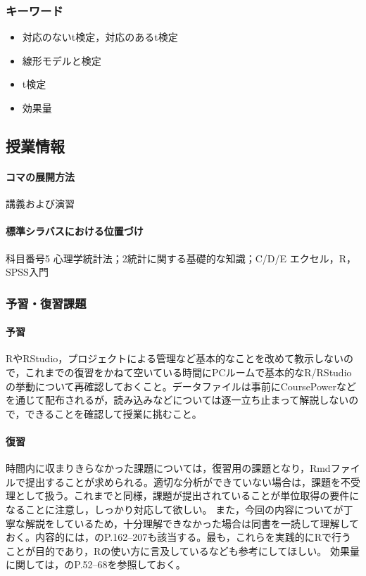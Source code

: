 \subsubsection{キーワード}
\begin{itemize}
    \item 対応のないt検定，対応のあるt検定
    \item 線形モデルと検定
    \item t検定
    \item 効果量
\end{itemize}
\subsection{授業情報}
\paragraph{コマの展開方法}
講義および演習
\paragraph{標準シラバスにおける位置づけ}
科目番号5 心理学統計法；2統計に関する基礎的な知識；C/D/E エクセル，R，SPSS入門
\subsubsection{予習・復習課題}
\paragraph{予習}
RやRStudio，プロジェクトによる管理など基本的なことを改めて教示しないので，これまでの復習をかねて空いている時間にPCルームで基本的なR/RStudioの挙動について再確認しておくこと。データファイルは事前にCoursePowerなどを通じて配布されるが，読み込みなどについては逐一立ち止まって解説しないので，できることを確認して授業に挑むこと。
\paragraph{復習}
時間内に収まりきらなかった課題については，復習用の課題となり，Rmdファイルで提出することが求められる。適切な分析ができていない場合は，課題を不受理として扱う。これまでと同様，課題が提出されていることが単位取得の要件になることに注意し，しっかり対応して欲しい。
また，今回の内容について\citet{橋本201607}が丁寧な解説をしているため，十分理解できなかった場合は同書を一読して理解しておく。内容的には，\citet{Yamada2004}のP.162--207も該当する。最も，これらを実践的にRで行うことが目的であり，Rの使い方に言及している\citet{kosugi2019}なども参考にしてほしい。
効果量に関しては，\citet{大久保201201}のP.52--68を参照しておく。